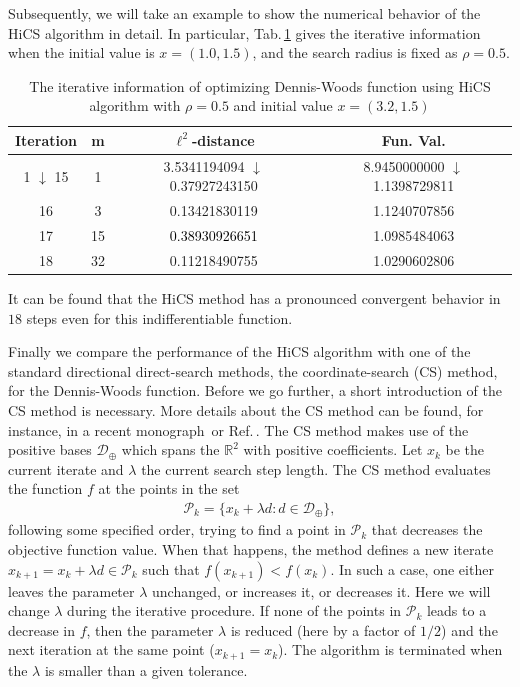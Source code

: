 \documentclass[final,1p,times]{elsarticle}
\begin{document}
Subsequently, we will take an example to show the 
numerical behavior of the HiCS algorithm in detail. 
In particular, Tab.\,\ref{tab:dw:HiCS} gives the iterative
information when the initial value is $x=(1.0, 1.5)$, and the
search radius is fixed as $\rho=0.5$. 
\begin{table}[!htbp]
\caption{
\label{tab:dw:HiCS}
The iterative information of optimizing Dennis-Woods function
using HiCS algorithm with $\rho=0.5$ and initial value $x=(3.2, 1.5)$}
\begin{center}
\begin{tabular}{|c|c|c|c|}
 \hline
  Iteration & m & $\ell^2$-distance &  Fun. Val.
 \\\hline
 \makecell{ 1 \\ $\downarrow$ \\ 15 } & 1 & \makecell{
 3.5341194094 \\ $\downarrow$ \\ 0.37927243150 }
 & \makecell{8.9450000000  \\ $\downarrow$ \\1.1398729811 }
 \\\hline
 16 & 3  &0.13421830119 & 1.1240707856
 \\\hline
 17 & 15  & \textcolor{black}{0.38930926651} & 1.0985484063
 \\\hline
 18 &32  & 0.11218490755 &  1.0290602806
 \\\hline
\end{tabular}
\end{center}
\end{table}
It can be found that the HiCS method has a pronounced convergent
behavior in $18$ steps even for this indifferentiable function.

Finally we compare the performance of the HiCS algorithm with one
of the standard directional direct-search methods, the
coordinate-search (CS) method, for the Dennis-Woods function.
Before we go further, a short introduction of the CS method is necessary. 
More details about the CS method can be found, for instance, 
in a recent monograph\,\cite{conn2009introduction} or
Ref.\,\cite{kolda2003optimization}. 
The CS method makes use of the positive bases
$\mathcal{D}_{\oplus}$ which spans the $\mathbb{R}^2$ with
positive coefficients. Let $x_k$ be the current iterate and
$\lambda$ the current search step length. The CS method evaluates
the function $f$ at the points in the set
\begin{align*}
	\mathcal{P}_k = \{x_k + \lambda d:
	d\in\mathcal{D}_{\oplus}\},
\end{align*}
following some specified order, trying to find a point in
$\mathcal{P}_k$ that decreases the objective function value. 
When that happens, the method defines a new iterate
$x_{k+1}=x_{k}+\lambda d \in \mathcal{P}_k$ such that
$f(x_{k+1})<f(x_{k})$. In such a case, one either leaves
the parameter $\lambda$ unchanged, or increases it, or decreases it. 
Here we will change $\lambda$ during the iterative procedure.
If none of the points in
$\mathcal{P}_k$ leads to a decrease in $f$, then the parameter
$\lambda$ is reduced (here by a factor of $1/2$) and the next
iteration at the same point ($x_{k+1}=x_{k}$). The
algorithm is terminated when the $\lambda$ is smaller than a
given tolerance. 
\end{document}
